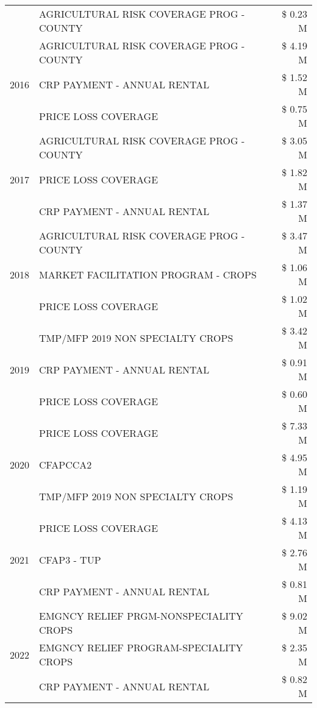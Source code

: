 \begin{tabular}{llr}
 & AGRICULTURAL RISK COVERAGE PROG - COUNTY & \$ 0.23 M \\
\cline{1-3}
\multirow[t]{3}{*}{2016} & AGRICULTURAL RISK COVERAGE PROG - COUNTY & \$ 4.19 M \\
 & CRP PAYMENT - ANNUAL RENTAL & \$ 1.52 M \\
 & PRICE LOSS COVERAGE & \$ 0.75 M \\
\cline{1-3}
\multirow[t]{3}{*}{2017} & AGRICULTURAL RISK COVERAGE PROG - COUNTY & \$ 3.05 M \\
 & PRICE LOSS COVERAGE & \$ 1.82 M \\
 & CRP PAYMENT - ANNUAL RENTAL & \$ 1.37 M \\
\cline{1-3}
\multirow[t]{3}{*}{2018} & AGRICULTURAL RISK COVERAGE PROG - COUNTY & \$ 3.47 M \\
 & MARKET FACILITATION PROGRAM - CROPS & \$ 1.06 M \\
 & PRICE LOSS COVERAGE & \$ 1.02 M \\
\cline{1-3}
\multirow[t]{3}{*}{2019} & TMP/MFP 2019 NON SPECIALTY CROPS & \$ 3.42 M \\
 & CRP PAYMENT - ANNUAL RENTAL & \$ 0.91 M \\
 & PRICE LOSS COVERAGE & \$ 0.60 M \\
\cline{1-3}
\multirow[t]{3}{*}{2020} & PRICE LOSS COVERAGE & \$ 7.33 M \\
 & CFAPCCA2 & \$ 4.95 M \\
 & TMP/MFP 2019 NON SPECIALTY CROPS & \$ 1.19 M \\
\cline{1-3}
\multirow[t]{3}{*}{2021} & PRICE LOSS COVERAGE & \$ 4.13 M \\
 & CFAP3 - TUP & \$ 2.76 M \\
 & CRP PAYMENT - ANNUAL RENTAL & \$ 0.81 M \\
\cline{1-3}
\multirow[t]{3}{*}{2022} & EMGNCY RELIEF PRGM-NONSPECIALITY CROPS & \$ 9.02 M \\
 & EMGNCY RELIEF PROGRAM-SPECIALITY CROPS & \$ 2.35 M \\
 & CRP PAYMENT - ANNUAL RENTAL & \$ 0.82 M \\
\cline{1-3}
\bottomrule
\end{tabular}
